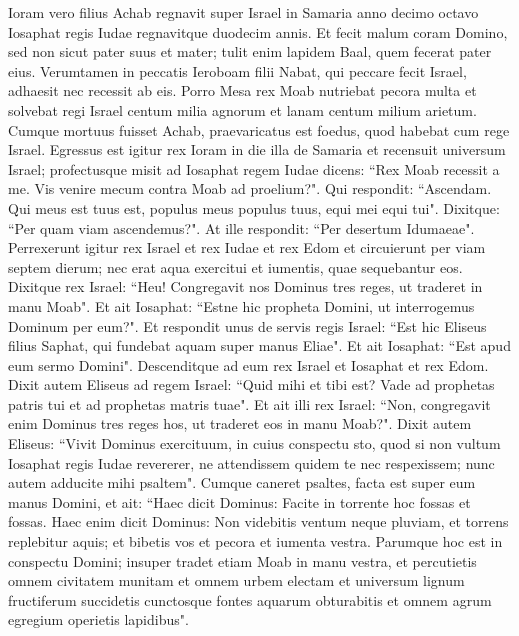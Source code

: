 \begin{biblechapter}  
\verse Ioram vero filius Achab regnavit super Israel in Samaria anno decimo octavo Iosaphat regis Iudae regnavitque duodecim annis. 
\verse Et fecit malum coram Domino, sed non sicut pater suus et mater; tulit enim lapidem Baal, quem fecerat pater eius. 
\verse Verumtamen in peccatis Ieroboam filii Nabat, qui peccare fecit Israel, adhaesit nec recessit ab eis. 
\verse Porro Mesa rex Moab nutriebat pecora multa et solvebat regi Israel centum milia agnorum et lanam centum milium arietum. 
\verse Cumque mortuus fuisset Achab, praevaricatus est foedus, quod habebat cum rege Israel. 
\verse Egressus est igitur rex Ioram in die illa de Samaria et recensuit universum Israel; 
\verse profectusque misit ad Iosaphat regem Iudae dicens: “Rex Moab recessit a me. Vis venire mecum contra Moab ad proelium?". Qui respondit: “Ascendam. Qui meus est tuus est, populus meus populus tuus, equi mei equi tui". 
\verse Dixitque: “Per quam viam ascendemus?". At ille respondit: “Per desertum Idumaeae". 
\verse Perrexerunt igitur rex Israel et rex Iudae et rex Edom et circuierunt per viam septem dierum; nec erat aqua exercitui et iumentis, quae sequebantur eos. 
\verse Dixitque rex Israel: “Heu! Congregavit nos Dominus tres reges, ut traderet in manu Moab". 
\verse Et ait Iosaphat: “Estne hic propheta Domini, ut interrogemus Dominum per eum?". Et respondit unus de servis regis Israel: “Est hic Eliseus filius Saphat, qui fundebat aquam super manus Eliae". 
\verse Et ait Iosaphat: “Est apud eum sermo Domini". Descenditque ad eum rex Israel et Iosaphat et rex Edom. 
\verse Dixit autem Eliseus ad regem Israel: “Quid mihi et tibi est? Vade ad prophetas patris tui et ad prophetas matris tuae". Et ait illi rex Israel: “Non, congregavit enim Dominus tres reges hos, ut traderet eos in manu Moab?". 
\verse Dixit autem Eliseus: “Vivit Dominus exercituum, in cuius conspectu sto, quod si non vultum Iosaphat regis Iudae revererer, ne attendissem quidem te nec respexissem; 
\verse nunc autem adducite mihi psaltem". Cumque caneret psaltes, facta est super eum manus Domini, 
\verse et ait: “Haec dicit Dominus: Facite in torrente hoc fossas et fossas. 
\verse Haec enim dicit Dominus: Non videbitis ventum neque pluviam, et torrens replebitur aquis; et bibetis vos et pecora et iumenta vestra. 
\verse Parumque hoc est in conspectu Domini; insuper tradet etiam Moab in manu vestra, 
\verse et percutietis omnem civitatem munitam et omnem urbem electam et universum lignum fructiferum succidetis cunctosque fontes aquarum obturabitis et omnem agrum egregium operietis lapidibus". 

\end{biblechapter}

